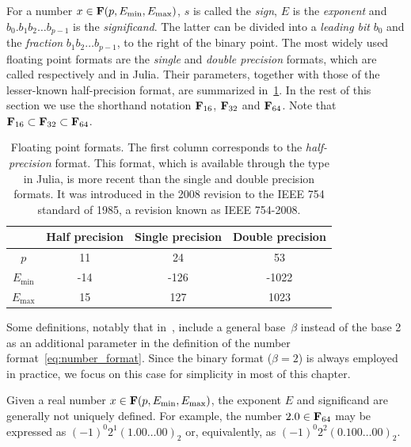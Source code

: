 For a number $x \in \mathbf F(p, E_{\min}, E_{\max})$,
$s$ is called the \emph{sign}, $E$ is the \emph{exponent} and
$b_0. b_1 b_2 \dots b_{p-1}$ is the \emph{significand}.
The latter can be divided into a \emph{leading bit} $b_0$ and the \emph{fraction} $b_1 b_2 \dots b_{p-1}$,
to the right of the binary point.
The most widely used floating point formats are the \emph{single} and \emph{double precision} formats,
which are called respectively  and  in Julia.
Their parameters,
together with those of the lesser-known half-precision format,
are summarized in~\cref{table:floating_point_formats}.
In the rest of this section we use the shorthand notation $\mathbf F_{16}$, $\mathbf F_{32}$ and $\mathbf F_{64}$.
Note that $\mathbf F_{16} \subset \mathbf F_{32} \subset \mathbf F_{64}$.
\begin{table}[ht]
    \centering
    \begin{tabular}{|c|c|c|c|}
        \hline
        & Half precision & Single precision & Double precision
        \\ \hline
        $p$ & 11 & 24 & 53
        \\ \hline
        $E_{\min}$ & -14 & -126 & -1022
        \\ \hline
        $E_{\max}$ & 15 & 127 & 1023
        \\ \hline
    \end{tabular}
    \caption{%
        Floating point formats.
        The first column corresponds to the \emph{half-precision} format.
        This format,
        which is available through the  type in Julia,
        is more recent than the single and double precision formats.
        It was introduced in the 2008 revision to the IEEE 754 standard of 1985,
        a revision known as IEEE 754-2008.
    }%
    \label{table:floating_point_formats}
\end{table}

\begin{remark}
    Some definitions,
    notably that in~\cite[Section 2.5.2]{MR2265914},
    include a general base~$\beta$ instead of the base 2
    as an additional parameter in the definition of the number format~\eqref{eq:number_format}.
    Since the binary format ($\beta = 2$) is always employed in practice,
    we focus on this case for simplicity in most of this chapter.
\end{remark}

\begin{remark}
    \label{remark:roundoff_non_uniqueness}
    Given a real number $x \in \mathbf F (p, E_{\min}, E_{\max})$,
    the exponent $E$ and significand  are generally not uniquely defined.
    For example, the number $2.0 \in \mathbf F_{64}$ may be expressed as $(-1)^0 2^1 (1.00\dots00)_2$ or, equivalently, as $(-1)^0 2^{2} (0.100\dots00)_2$.
\end{remark}


